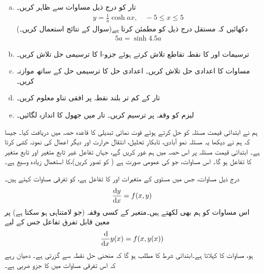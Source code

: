 \begin{enumerate}[a.]
\item
تار کو درج ذیل مساوات سے ظاہر کریں۔
\begin{align*}
y=\frac{1}{a}\cosh ax,\quad -5\le x\le 5
\end{align*}
دکھائیں کہ مستقل   درج ذیل کو مطمئن کرتا ہے(سوال  کے نتائج استعمال کریں۔)
\begin{align}\label{مساوات_ماورائی_لیزم}
5a=\sinh 4.5a
\end{align}
\item
 ترسیمات  اور   کا نقطہ تقاطع تلاش کرتے ہوئے جزو-ا کا ترسیمی حل تلاش کریں۔
\item
مساوات  کا اعدادی حل تلاش کریں۔ اعدادی حل کا ترسیمی حل کے ساتھ موازنہ کریں۔
\item
تار کے کم تر بلند نقطہ پر افقی تناو معلوم کریں۔
\item
لیزم  کو وقفہ  پر ترسیم کریں۔ تار میں جھول کا اندازہ لگائیں۔
\end{enumerate}




ہم نے ابتدائی قیمت مسئلہ  کو حل کرتے ہوئے قوت نمائی تبدیلی  کا قاعدہ حصہ  میں دریافت کیا۔ جیسا کہ ہم نے دیکھا یہ مسئلہ نمو آبادی، تابکار تحلیل، انتقال حرارت اور دیگر اعمال کی نمونہ کشی کرتا ہے۔  ابتدائی قیمت مسئلہ  پر  اس حصہ میں ہم غور کریں گے،  جہاں تفاعل  غیر تابع متغیر  اور تابع متغیر  کا تفاعل ہو گا۔ اس مساوات، جو   کی عمومی صورت ہے ( کو  تصور کریں)،کا استعمال زیادہ  وسیع ہے۔

درج ذیل مساوات، جس میں  مستوی  کے متغیرات  اور   کا تفاعل  ہے،   کو  تفرقی مساوات کہتے ہیں۔
\begin{align}\label{مساوات_ماورائی_یک_رتبی_تفرقی_الف}
\frac{\dif y}{\dif x}=f(x,y)
\end{align}
اس مساوات کو ہم  بھی لکھتے ہیں۔متغیر  کے کسی وقفہ (جو لامتناہی ہو سکتا ہے) پر معین قابل تفرق تفاعل  جس کے لیے
\begin{align*}
\frac{\dif}{\dif x}y(x)=f(x,y(x))
\end{align*}
ہو، مساوات  کا  کہلاتا ہے۔ابتدائی شرط  کا مطلب ہو گا کہ منحنی حل  نقطہ  سے گزرتی ہے۔ دھیان رہے کہ اس تفرقی مساوات میں  کا جزو ضربی  ہے۔

